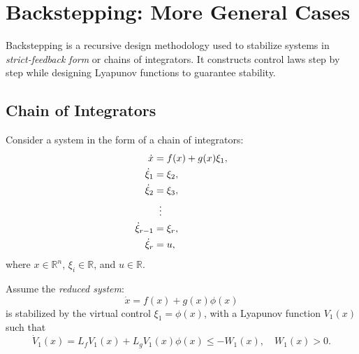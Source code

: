 \section{Backstepping: More General Cases}

Backstepping is a recursive design methodology used to stabilize systems in \textit{strict-feedback form} or chains of integrators. It constructs control laws step by step while designing Lyapunov functions to guarantee stability.

\subsection{Chain of Integrators}

Consider a system in the form of a chain of integrators:
\begin{align}
    \dot{x} &= f(x) + g(x)\xi_1, \\
    \dot{\xi}_1 &= \xi_2, \\
    \dot{\xi}_2 &= \xi_3, \\
    &\;\;\vdots \notag\\
    \dot{\xi}_{r-1} &= \xi_r, \\
    \dot{\xi}_r &= u,
\end{align}
where $x \in \mathbb{R}^n$, $\xi_i \in \mathbb{R}$, and $u \in \mathbb{R}$.  

Assume the \textit{reduced system}:
\[
\dot{x} = f(x) + g(x)\phi(x)
\]
is stabilized by the virtual control $\xi_1 = \phi(x)$, with a Lyapunov function $V_1(x)$ such that
\[
\dot{V}_1(x) = L_f V_1(x) + L_g V_1(x) \phi(x) \leq -W_1(x), \quad W_1(x) > 0.
\]

